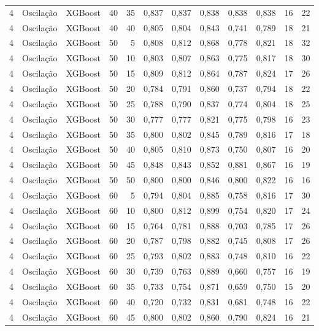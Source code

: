 \begin{longtable}{ccclrrrrrrrr}
4 & Oscilação & XGBoost & 40 & 35 & 0,837 & 0,837 & 0,838 & 0,838 & 0,838 & 16 & 22 \\
4 & Oscilação & XGBoost & 40 & 40 & 0,805 & 0,804 & 0,843 & 0,741 & 0,789 & 18 & 21 \\
4 & Oscilação & XGBoost & 50 & 5 & 0,808 & 0,812 & 0,868 & 0,778 & 0,821 & 18 & 32 \\
4 & Oscilação & XGBoost & 50 & 10 & 0,803 & 0,807 & 0,863 & 0,775 & 0,817 & 18 & 30 \\
4 & Oscilação & XGBoost & 50 & 15 & 0,809 & 0,812 & 0,864 & 0,787 & 0,824 & 17 & 26 \\
4 & Oscilação & XGBoost & 50 & 20 & 0,784 & 0,791 & 0,860 & 0,737 & 0,794 & 18 & 22 \\
4 & Oscilação & XGBoost & 50 & 25 & 0,788 & 0,790 & 0,837 & 0,774 & 0,804 & 18 & 25 \\
4 & Oscilação & XGBoost & 50 & 30 & 0,777 & 0,777 & 0,821 & 0,775 & 0,798 & 16 & 23 \\
4 & Oscilação & XGBoost & 50 & 35 & 0,800 & 0,802 & 0,845 & 0,789 & 0,816 & 17 & 18 \\
4 & Oscilação & XGBoost & 50 & 40 & 0,805 & 0,810 & 0,873 & 0,750 & 0,807 & 16 & 20 \\
4 & Oscilação & XGBoost & 50 & 45 & 0,848 & 0,843 & 0,852 & 0,881 & 0,867 & 16 & 19 \\
4 & Oscilação & XGBoost & 50 & 50 & 0,800 & 0,800 & 0,846 & 0,800 & 0,822 & 16 & 16 \\
4 & Oscilação & XGBoost & 60 & 5 & 0,794 & 0,804 & 0,885 & 0,758 & 0,816 & 17 & 30 \\
4 & Oscilação & XGBoost & 60 & 10 & 0,800 & 0,812 & 0,899 & 0,754 & 0,820 & 17 & 24 \\
4 & Oscilação & XGBoost & 60 & 15 & 0,764 & 0,781 & 0,888 & 0,703 & 0,785 & 17 & 26 \\
4 & Oscilação & XGBoost & 60 & 20 & 0,787 & 0,798 & 0,882 & 0,745 & 0,808 & 17 & 26 \\
4 & Oscilação & XGBoost & 60 & 25 & 0,793 & 0,802 & 0,883 & 0,748 & 0,810 & 16 & 22 \\
4 & Oscilação & XGBoost & 60 & 30 & 0,739 & 0,763 & 0,889 & 0,660 & 0,757 & 16 & 19 \\
4 & Oscilação & XGBoost & 60 & 35 & 0,733 & 0,754 & 0,871 & 0,659 & 0,750 & 15 & 20 \\
4 & Oscilação & XGBoost & 60 & 40 & 0,720 & 0,732 & 0,831 & 0,681 & 0,748 & 16 & 22 \\
4 & Oscilação & XGBoost & 60 & 45 & 0,800 & 0,802 & 0,860 & 0,790 & 0,824 & 16 & 21 \\

\end{longtable}
